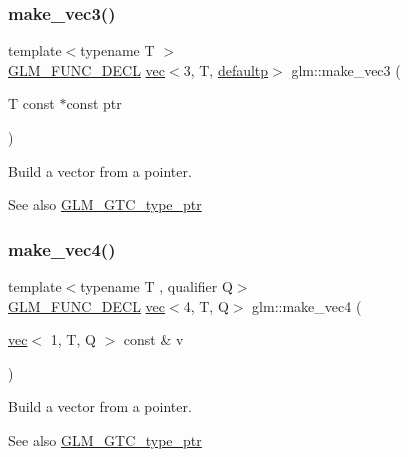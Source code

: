 \subsubsection{\texorpdfstring{make\+\_\+vec3()}{make\_vec3()}\hspace{0.1cm}{\footnotesize\ttfamily [5/5]}}
{\footnotesize\ttfamily template$<$typename T $>$ \\
\mbox{\hyperlink{setup_8hpp_ab2d052de21a70539923e9bcbf6e83a51}{G\+L\+M\+\_\+\+F\+U\+N\+C\+\_\+\+D\+E\+CL}} \mbox{\hyperlink{structglm_1_1vec}{vec}}$<$3, T, \mbox{\hyperlink{namespaceglm_a36ed105b07c7746804d7fdc7cc90ff25a9d21ccd8b5a009ec7eb7677befc3bf51}{defaultp}}$>$ glm\+::make\+\_\+vec3 (\begin{DoxyParamCaption}\item[{T const $\ast$const}]{ptr }\end{DoxyParamCaption})}

Build a vector from a pointer. \begin{DoxySeeAlso}{See also}
\mbox{\hyperlink{group__gtc__type__ptr}{G\+L\+M\+\_\+\+G\+T\+C\+\_\+type\+\_\+ptr}} 
\end{DoxySeeAlso}
\mbox{\label{group__gtc__type__ptr_ga600cb97f70c5d50d3a4a145e1cafbf37}} 
\subsubsection{\texorpdfstring{make\+\_\+vec4()}{make\_vec4()}\hspace{0.1cm}{\footnotesize\ttfamily [1/5]}}
{\footnotesize\ttfamily template$<$typename T , qualifier Q$>$ \\
\mbox{\hyperlink{setup_8hpp_ab2d052de21a70539923e9bcbf6e83a51}{G\+L\+M\+\_\+\+F\+U\+N\+C\+\_\+\+D\+E\+CL}} \mbox{\hyperlink{structglm_1_1vec}{vec}}$<$4, T, Q$>$ glm\+::make\+\_\+vec4 (\begin{DoxyParamCaption}\item[{\mbox{\hyperlink{structglm_1_1vec}{vec}}$<$ 1, T, Q $>$ const \&}]{v }\end{DoxyParamCaption})\hspace{0.3cm}{\ttfamily [inline]}}

Build a vector from a pointer. \begin{DoxySeeAlso}{See also}
\mbox{\hyperlink{group__gtc__type__ptr}{G\+L\+M\+\_\+\+G\+T\+C\+\_\+type\+\_\+ptr}} 
\end{DoxySeeAlso}
\mbox{\label{group__gtc__type__ptr_gaa9bd116caf28196fd1cf00b278286fa7}} 
